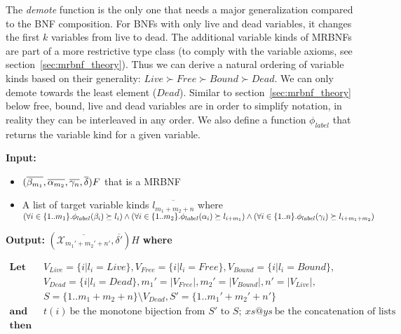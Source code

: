 The \textit{demote} function is the only one that needs a major generalization compared to the \ac{BNF} composition. For \acp{BNF} with only live and dead variables, it changes the first $k$ variables from live to dead. The additional variable kinds of \acp{MRBNF} are part of a more restrictive type class (to comply with the variable axioms, see section~\ref{sec:mrbnf_theory}). Thus we can derive a natural ordering of variable kinds based on their generality: $Live \succ Free \succ Bound \succ Dead$. We can only demote towards the least element ($Dead$). Similar to section~\ref{sec:mrbnf_theory} below free, bound, live and dead variables are in order to simplify notation, in reality they can be interleaved in any order. We also define a function $\phi_{label}$ that returns the variable kind for a given variable.

\newcommand{\lab}[1]{\phi_{label}(#1)}

\vspace*{1em}
\noindent
\textbf{Input:}
\begin{itemize}
\item{$(\overline{\beta_{m_1}}, \overline{\alpha_{m_2}}, \overline{\gamma_n}, \overline{\delta}) F$ that is a \ac{MRBNF}}
\item{A list of target variable kinds $\overline{l_{m_1+m_2+n}}$ where $(\forall i \in \{1..m_1\}. \lab{\beta_i} \succeq l_i) \wedge \\
(\forall i \in \{1..m_2\}. \lab{\alpha_i} \succeq l_{i+m_1}) \wedge (\forall i \in \{1..n\}. \lab{\gamma_i} \succeq l_{i+m_1+m_2})$}
\end{itemize}

\noindent
\textbf{Output:} $(\overline{\mathcal{X}_{m_1'+m_2'+n'}}, \overline{\delta'})H$ \textbf{where}

\hspace*{\parindent-1.7em}
$\begin{array}{ll}
\textbf{Let} \quad & V_{Live} = \{ i | l_i = Live \}, V_{Free} = \{ i | l_i = Free \}, V_{Bound} = \{ i | l_i = Bound \}, \\
& V_{Dead} = \{ i | l_i = Dead \}, m_1' = |V_{Free}|, m_2' = |V_{Bound}|, n' = |V_{Live}|, \\
& S = \{1..m_1+m_2+n\} \setminus V_{Dead}, S' = \{1..m_1'+m_2'+n'\} \\
\textbf{and} & t(i) \: \text{be the monotone bijection from $S'$ to $S$}; \: xs @ ys \: \text{be the concatenation of lists} \\
\textbf{then} & \\
\end{array}$\vspace{-1em}

